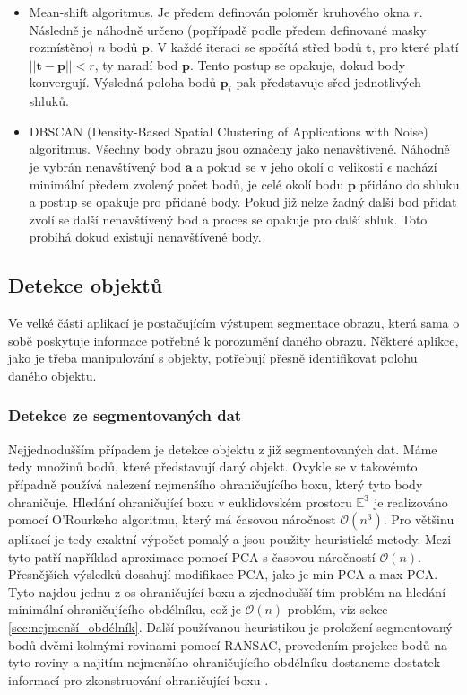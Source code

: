 \documentclass[twoside]{ctuthesis}
\newcommand{\tl}[1]{$\mathbf{#1}$}
\begin{document}
\begin{itemize}
\begin{itemize}
        \item Mean-shift algoritmus. Je předem definován poloměr kruhového okna $r$. Následně je náhodně určeno (popřípadě podle předem definované masky rozmístěno) $n$ bodů \tl{p}. V každé iteraci se spočítá střed bodů $\mathbf{t}$, pro které platí $||\mathbf{t} - \mathbf{p}|| < r$, ty naradí bod \tl{p}. Tento postup se opakuje, dokud body konvergují. Výsledná poloha bodů $\mathbf{p}_i$ pak představuje sřed jednotlivých shluků. 
        \item DBSCAN (Density-Based Spatial Clustering of Applications with Noise) algoritmus. Všechny body obrazu jsou označeny jako nenavštívené. Náhodně je vybrán nenavštívený bod \tl{a} a pokud se v jeho okolí o velikosti $\epsilon$ nachází minimální předem zvolený počet bodů, je celé okolí bodu \tl{p} přidáno do shluku a postup se opakuje pro přidané body. Pokud již nelze žadný další bod přidat zvolí se další nenavštívený bod a proces se opakuje pro další shluk. Toto probíhá dokud existují nenavštívené body. \cite{dbscan_clustering}
    \end{itemize}
\end{itemize}

\subsection{Detekce objektů}
Ve velké části aplikací je postačujícím výstupem segmentace obrazu, která sama o sobě poskytuje informace potřebné k porozumění daného obrazu. Některé aplikce, jako je třeba manipulování s objekty, potřebují přesně identifikovat polohu daného objektu. 

\subsubsection{Detekce ze segmentovaných dat}
Nejjednodušším případem je detekce objektu z již segmentovaných dat. Máme tedy množinů bodů, které představují daný objekt. Ovykle se v takovémto případně používá nalezení nejmenšího ohraničujícího boxu, který tyto body ohraničuje. Hledání ohraničující boxu v euklidovském prostoru $\mathbb{E^3}$ je realizováno pomocí O’Rourkeho algoritmu, který má časovou náročnost $\mathcal{O}(n^3)$. Pro většinu aplikací je tedy exaktní výpočet pomalý a jsou použity heuristické metody. Mezi tyto patří například aproximace pomocí PCA s časovou náročností $\mathcal{O}(n)$. Přesnějších výsledků dosahují modifikace PCA, jako je min-PCA a max-PCA. Tyto najdou jednu z os ohraničující boxu a zjednodušší tím problém na hledání minimální ohraničujícího obdélníku, což je $\mathcal{O}(n)$ problém, viz sekce \ref{sec:nejmenší_obdélník}. Další používanou heuristikou je proložení segmentovaný bodů dvěmi kolmými rovinami pomocí RANSAC, provedením projekce bodů na tyto roviny a najitím nejmenšího ohraničujícího obdélníku dostaneme dostatek informací pro zkonstruování ohraničující boxu \cite{jia20133d}. \cite{chang2011fast}
\end{document}
